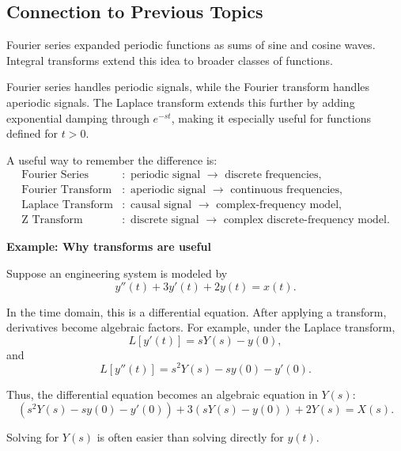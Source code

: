 \subsection*{Connection to Previous Topics}

Fourier series expanded periodic functions as sums of sine and cosine waves. Integral transforms extend this idea to broader classes of functions.

Fourier series handles periodic signals, while the Fourier transform handles aperiodic signals. The Laplace transform extends this further by adding exponential damping through $e^{-st}$, making it especially useful for functions defined for $t>0$.

\begin{noteBox}
    A useful way to remember the difference is:
    \[
        \begin{aligned}
            \text{Fourier Series}    & :\text{ periodic signal } \rightarrow \text{ discrete frequencies},             \\
            \text{Fourier Transform} & :\text{ aperiodic signal } \rightarrow \text{ continuous frequencies},          \\
            \text{Laplace Transform} & :\text{ causal signal } \rightarrow \text{ complex-frequency model},            \\
            \text{Z Transform}       & :\text{ discrete signal } \rightarrow \text{ complex discrete-frequency model}.
        \end{aligned}
    \]
\end{noteBox}

\begin{examplebox}
    \textbf{Example: Why transforms are useful}

    Suppose an engineering system is modeled by
    \[
        y''(t)+3y'(t)+2y(t)=x(t).
    \]

    In the time domain, this is a differential equation. After applying a transform, derivatives become algebraic factors. For example, under the Laplace transform,
    \[
        L[y'(t)] = sY(s)-y(0),
    \]
    and
    \[
        L[y''(t)] = s^2Y(s)-sy(0)-y'(0).
    \]

    Thus, the differential equation becomes an algebraic equation in $Y(s)$:
    \[
        \left(s^2Y(s)-sy(0)-y'(0)\right)
        +3\left(sY(s)-y(0)\right)
        +2Y(s)=X(s).
    \]

    Solving for $Y(s)$ is often easier than solving directly for $y(t)$.
\end{examplebox}

